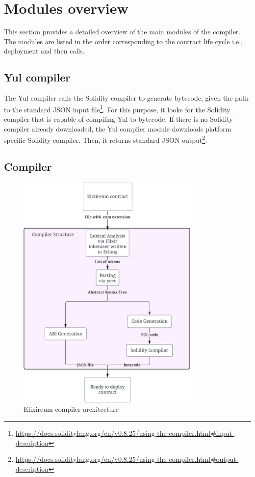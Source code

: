 \section{Modules overview}
\label{sec:modules_overview}
This section provides a detailed overview of the main modules of the compiler. The modules are listed in the order corresponding to the contract life cycle i.e., deployment and then calls.
\subsection{Yul compiler}
The Yul compiler calls the Solidity compiler to generate bytecode, given the path to the standard JSON input file\footnote{\url{https://docs.soliditylang.org/en/v0.8.25/using-the-compiler.html\#input-description}}. For this purpose, it looks for the Solidity compiler that is capable of compiling Yul to bytecode. If there is no Solidity compiler already downloaded, the Yul compiler module downloads platform specific Solidity compiler. Then, it returns standard JSON output\footnote{\url{https://docs.soliditylang.org/en/v0.8.25/using-the-compiler.html\#output-description}}.
\subsection{Compiler}
\label{ssec:compiler}


\begin{figure}[H]
  \centering
  \includegraphics[width=0.8\textwidth]{figs/arch.png}
  \caption{Elixireum compiler architecture}
  \label{fig:arch}
\end{figure}

